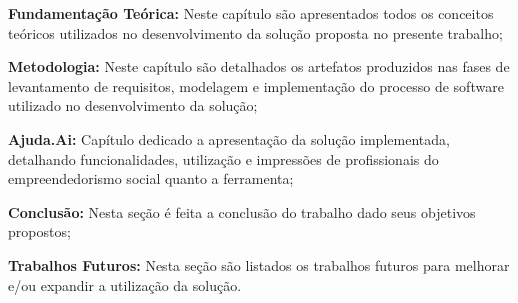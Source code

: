 \begin{lista}
  \item \textbf{Fundamentação Teórica:} Neste capítulo são apresentados todos os conceitos teóricos utilizados no desenvolvimento da solução proposta no presente trabalho;
  \item \textbf{Metodologia:} Neste capítulo são detalhados os artefatos produzidos nas fases de levantamento de requisitos, modelagem e implementação do processo de software utilizado no desenvolvimento da solução;
  \item \textbf{Ajuda.Ai:} Capítulo dedicado a apresentação da solução implementada, detalhando funcionalidades, utilização e impressões de profissionais do empreendedorismo social quanto a ferramenta;
  \item \textbf{Conclusão:} Nesta seção é feita a conclusão do trabalho dado seus objetivos propostos;
  \item \textbf{Trabalhos Futuros:} Nesta seção são listados os trabalhos futuros para melhorar e/ou expandir a utilização da solução.
\end{lista}